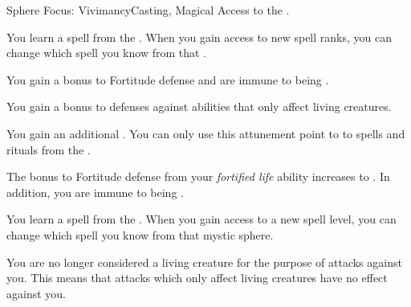     \begin{feat}{Sphere Focus: Vivimancy}{Casting, Magical}
        \featpre Access to the  .

         You learn a spell from the  .
        When you gain access to new spell ranks, you can change which spell you know from that .

         You gain a  bonus to Fortitude defense and are immune to being .

         You gain a  bonus to defenses against abilities that only affect living creatures.

         You gain an additional .
        You can only use this attunement point to  to spells and rituals from the  .

         The bonus to Fortitude defense from your \textit{fortified life} ability increases to .
        In addition, you are immune to being .

         You learn a spell from the  .
        When you gain access to a new spell level, you can change which spell you know from that mystic sphere.

         You are no longer considered a living creature for the purpose of attacks against you.
        This means that attacks which only affect living creatures have no effect against you.
    \end{feat}

